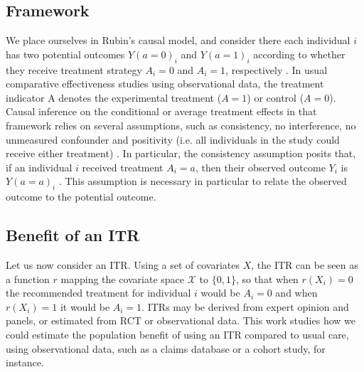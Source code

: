 \documentclass[10pt]{article}
\begin{document}
\subsection{Framework}

We place ourselves in Rubin’s causal model, and consider there each individual $i$ has two potential outcomes $Y(a=0)_i$ and $Y(a=1)_i$ according to whether they receive treatment strategy $A_i = 0$ and $A_i = 1$, respectively \cite{Rubin1974}. In usual comparative effectiveness studies using observational data, the treatment indicator A denotes the experimental treatment ($A = 1$) or control ($A = 0$). Causal inference on the conditional or average treatment effects in that framework relies on several assumptions, such as consistency, no interference, no unmeasured confounder and positivity (i.e. all individuals in the study could receive either treatment) \cite{Rubin1986,Hernan2012}. In particular, the consistency assumption posits that, if an individual $i$ received treatment $A_i = a$, then their observed outcome $Y_i$ is $Y(a=a)_i$ \cite{Pearl2010}. This assumption is necessary in particular to relate the observed outcome to the potential outcome. 

\subsection{Benefit of an ITR}

Let us now consider an ITR. Using a set of covariates $X$, the ITR can be seen as a function $r$ mapping the covariate space $\mathcal{X}$ to $\{0, 1\}$, so that when $r(X_i) = 0$ the recommended treatment for individual $i$ would be $A_i = 0$ and when $r(X_i) = 1$ it would be $A_i = 1$. ITRs may be derived from expert opinion and panels, or estimated from RCT or observational data. This work studies how we could estimate the population benefit of using an ITR compared to usual care, using observational data, such as a claims database or a cohort study, for instance.
\end{document}
